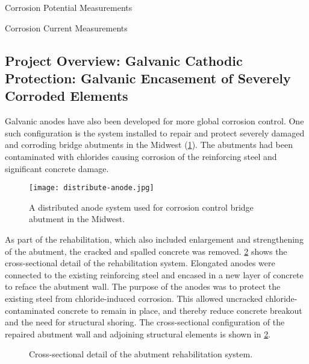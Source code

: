 \begin{table}
  \caption{Corrosion Potential Measurements}
  \label{tab:corrosion-potential-measurements}
\end{table}

\begin{table}
  \caption{Corrosion Current Measurements}
  \label{tab:corrosion-current-measurements}
\end{table}

\subsection{Project Overview: Galvanic Cathodic Protection: Galvanic Encasement of Severely Corroded Elements}

Galvanic anodes have also been developed for more global corrosion control. One such configuration is the system installed to repair and protect severely damaged and corroding bridge abutments in the Midwest (\cref{fig:distribute-anode}). The abutments had been contaminated with chlorides causing corrosion of the reinforcing steel and significant concrete damage.

\begin{figure}
  \texttt{[image: distribute-anode.jpg]}
  \caption{A distributed anode system used for corrosion control bridge abutment in the Midwest.}
  \label{fig:distribute-anode}
\end{figure}

As part of the rehabilitation, which also included enlargement and strengthening of the abutment, the cracked and spalled concrete was removed. \cref{fig:abutment-section-rehabilitation} shows the cross-sectional detail of the rehabilitation system. Elongated anodes were connected to the existing reinforcing steel and encased in a new layer of concrete to reface the abutment wall. The purpose of the anodes was to protect the existing steel from chloride-induced corrosion. This allowed uncracked chloride-contaminated concrete to remain in place, and thereby reduce concrete breakout and the need for structural shoring. The cross-sectional configuration of the repaired abutment wall and adjoining structural elements is shown in \cref{fig:abutment-section-rehabilitation}.

\begin{figure}
  \caption{Cross-sectional detail of the abutment rehabilitation system.}\label{fig:abutment-section-rehabilitation}
\end{figure}


